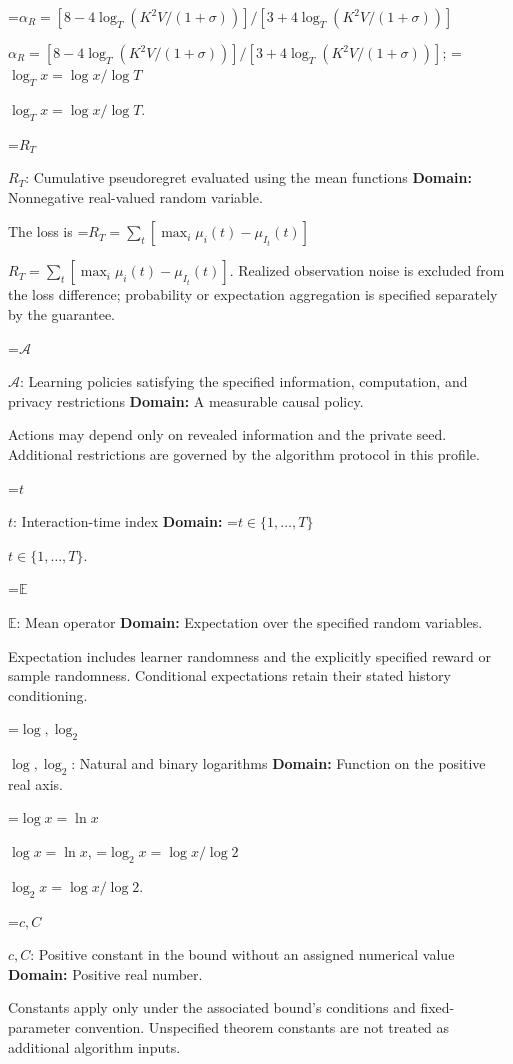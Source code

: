 \documentclass[10pt,a4paper]{article}
\newcommand{\AtlasMath}[1]{\par\begingroup\centering\setbox0=\hbox{$\displaystyle #1$}\ifdim\wd0>1.4\linewidth\typeout{ATLAS WIDE FORMULA: \the\wd0}\fi\ifdim\wd0>\linewidth\resizebox{\linewidth}{!}{\box0}\else\box0\fi\par\endgroup}
\newcommand{\AtlasInlineMath}[1]{\begingroup\setbox0=\hbox{$#1$}\ifdim\wd0>.4\linewidth\endgroup\AtlasMath{#1}\else\endgroup$#1$\fi}
\begin{document}
\AtlasInlineMath{\alpha_R=[8-4\log_T(K^2V/(1+\sigma))]/[3+4\log_T(K^2V/(1+\sigma))]}; \AtlasInlineMath{\log_Tx=\log x/\log T}.



\AtlasInlineMath{R_T}: Cumulative pseudoregret evaluated using the mean functions \textbf{Domain:} Nonnegative real-valued random variable.



The loss is \AtlasInlineMath{R_T=\sum_t[\max_i\mu_i(t)-\mu_{I_t}(t)]}. Realized observation noise is excluded from the loss difference; probability or expectation aggregation is specified separately by the guarantee.



\AtlasInlineMath{\mathcal A}: Learning policies satisfying the specified information, computation, and privacy restrictions \textbf{Domain:} A measurable causal policy.



Actions may depend only on revealed information and the private seed. Additional restrictions are governed by the algorithm protocol in this profile.



\AtlasInlineMath{t}: Interaction-time index \textbf{Domain:} \AtlasInlineMath{t\in\{1,\ldots,T\}}.



\AtlasInlineMath{\mathbb E}: Mean operator \textbf{Domain:} Expectation over the specified random variables.



Expectation includes learner randomness and the explicitly specified reward or sample randomness. Conditional expectations retain their stated history conditioning.



\AtlasInlineMath{\log,\log_2}: Natural and binary logarithms \textbf{Domain:} Function on the positive real axis.



\AtlasInlineMath{\log x=\ln x}, \AtlasInlineMath{\log_2x=\log x/\log2}.



\AtlasInlineMath{c,C}: Positive constant in the bound without an assigned numerical value \textbf{Domain:} Positive real number.



Constants apply only under the associated bound’s conditions and fixed-parameter convention. Unspecified theorem constants are not treated as additional algorithm inputs.
\end{document}

